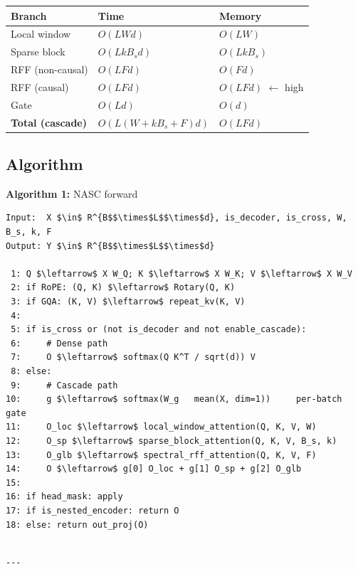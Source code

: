\begin{table}[H]
\centering
\small
\begin{tabular}{lll}
\toprule
\textbf{Branch} & \textbf{Time} & \textbf{Memory} \\
\midrule
Local window & $O(L W d)$ & $O(L W)$ \\
Sparse block & $O(L k B_s d)$ & $O(L k B_s)$ \\
RFF (non-causal) & $O(L F d)$ & $O(F d)$ \\
RFF (causal) & $O(L F d)$ & $O(L F d)$ $\leftarrow$ high \\
Gate & $O(L d)$ & $O(d)$ \\
\textbf{Total (cascade)} & $O(L(W + k B_s + F) d)$ & $O(L F d)$ \\
\bottomrule
\end{tabular}
\end{table}

\subsection{Algorithm}

\textbf{Algorithm 1:} NASC forward
\begin{lstlisting}
Input:  X $\in$ R^{B$$\times$L$$\times$d}, is_decoder, is_cross, W, B_s, k, F
Output: Y $\in$ R^{B$$\times$L$$\times$d}

 1: Q $\leftarrow$ X W_Q; K $\leftarrow$ X W_K; V $\leftarrow$ X W_V
 2: if RoPE: (Q, K) $\leftarrow$ Rotary(Q, K)
 3: if GQA: (K, V) $\leftarrow$ repeat_kv(K, V)
 4:
 5: if is_cross or (not is_decoder and not enable_cascade):
 6:     # Dense path
 7:     O $\leftarrow$ softmax(Q K^T / sqrt(d)) V
 8: else:
 9:     # Cascade path
10:     g $\leftarrow$ softmax(W_g   mean(X, dim=1))     per-batch gate
11:     O_loc $\leftarrow$ local_window_attention(Q, K, V, W)
12:     O_sp $\leftarrow$ sparse_block_attention(Q, K, V, B_s, k)
13:     O_glb $\leftarrow$ spectral_rff_attention(Q, K, V, F)
14:     O $\leftarrow$ g[0] O_loc + g[1] O_sp + g[2] O_glb
15:
16: if head_mask: apply
17: if is_nested_encoder: return O
18: else: return out_proj(O)
\end{lstlisting}
\begin{lstlisting}

---
\end{lstlisting}